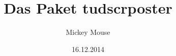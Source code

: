 \documentclass[%
  ngerman,
  cdgeometry=on,
]%
{tudscrreprtnew}
\begin{document}
\date{16.12.2014}
\author{Mickey Mouse}
\title{Das Paket tudscrposter}
\maketitle

\end{document}
